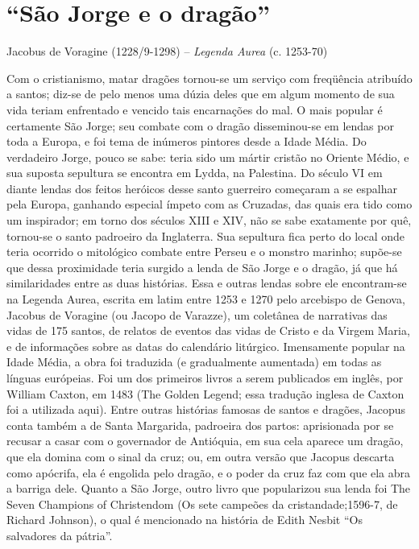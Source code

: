 \section{“São Jorge e o dragão”}

Jacobus de Voragine (1228/9-1298) -- \textit{Legenda Aurea} (c. 1253-70)

Com o cristianismo, matar dragões tornou-se um serviço com freqüência
atribuído a santos; diz-se de pelo menos uma dúzia deles que em algum
momento de sua vida teriam enfrentado e vencido tais encarnações do
mal. O mais popular é certamente São Jorge; seu combate com o dragão
disseminou-se em lendas por toda a Europa, e foi tema de inúmeros
pintores desde a Idade Média. Do verdadeiro Jorge, pouco se sabe:
teria sido um mártir cristão no Oriente Médio, e sua suposta
sepultura se encontra em Lydda, na Palestina. Do século VI em diante
lendas dos feitos heróicos desse santo guerreiro começaram a se
espalhar pela Europa, ganhando especial ímpeto com as Cruzadas, das
quais era tido como um inspirador; em torno dos séculos XIII e XIV,
não se sabe exatamente por quê, tornou-se o santo padroeiro da
Inglaterra. Sua sepultura fica perto do local onde teria ocorrido o
mitológico combate entre Perseu e o monstro marinho; supõe-se que
dessa proximidade teria surgido a lenda de São Jorge e o dragão, já
que há similaridades entre as duas histórias. Essa e outras lendas
sobre ele encontram-se na Legenda Aurea, escrita em latim entre 1253
e 1270 pelo arcebispo de Genova, Jacobus de Voragine (ou Jacopo de
Varazze), um coletânea de narrativas das vidas de 175 santos, de
relatos de eventos das vidas de Cristo e da Virgem Maria, e de
informações sobre as datas do calendário litúrgico. Imensamente
popular na Idade Média, a obra foi traduzida (e gradualmente
aumentada) em todas as línguas európeias. Foi um dos primeiros livros
a serem publicados em inglês, por William Caxton, em 1483 (The Golden
Legend; essa tradução inglesa de Caxton foi a utilizada aqui). Entre
outras histórias famosas de santos e dragões, Jacopus conta também a
de Santa Margarida, padroeira dos partos: aprisionada por se recusar
a casar com o governador de Antióquia, em sua cela aparece um dragão,
que ela domina com o sinal da cruz; ou, em outra versão que Jacopus
descarta como apócrifa, ela é engolida pelo dragão, e o poder da cruz
faz com que ela abra a barriga dele. Quanto a São Jorge, outro livro
que popularizou sua lenda foi The Seven Champions of Christendom (Os
sete campeões da cristandade;1596-7, de Richard Johnson), o qual é
mencionado na história de Edith Nesbit “Os salvadores da pátria”. 


